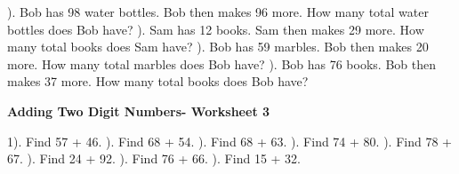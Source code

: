 \documentclass{article}%
\begin{document}
\newline%
\newline%
). Bob has 98 water bottles. Bob then makes 96 more. How many total water bottles does Bob have?%
\newline%
\newline%
). Sam has 12 books. Sam then makes 29 more. How many total books does Sam have?%
\newline%
\newline%
). Bob has 59 marbles. Bob then makes 20 more. How many total marbles does Bob have?%
\newline%
\newline%
). Bob has 76 books. Bob then makes 37 more. How many total books does Bob have?%
\newline%
\newline%
\newline%
\pagebreak%
\large%
\begin{center}%
\textbf{Adding Two Digit Numbers- Worksheet 3}%
\newline%
\end{center} \normalsize%
1). Find 57 + 46.%
\newline%
\newline%
). Find 68 + 54.%
\newline%
\newline%
). Find 68 + 63.%
\newline%
\newline%
). Find 74 + 80.%
\newline%
\newline%
). Find 78 + 67.%
\newline%
\newline%
). Find 24 + 92.%
\newline%
\newline%
). Find 76 + 66.%
\newline%
\newline%
). Find 15 + 32.%
\newline%
\newline%
\end{document}
